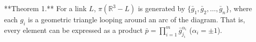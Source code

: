 **Theorem 1.** For a link $L$, $\pi(\mathbb{R}^3 - L)$ is generated by $\{\bar{g}_1, \bar{g}_2, \ldots, \bar{g}_n\}$, where each $g_i$ is a geometric triangle looping around an arc of the diagram. That is, every element can be expressed as a product $\bar{p} = \prod_{i=1}^{m} \bar{g}_{j_i}^{\alpha_i}$ ($\alpha_i = \pm 1$).
